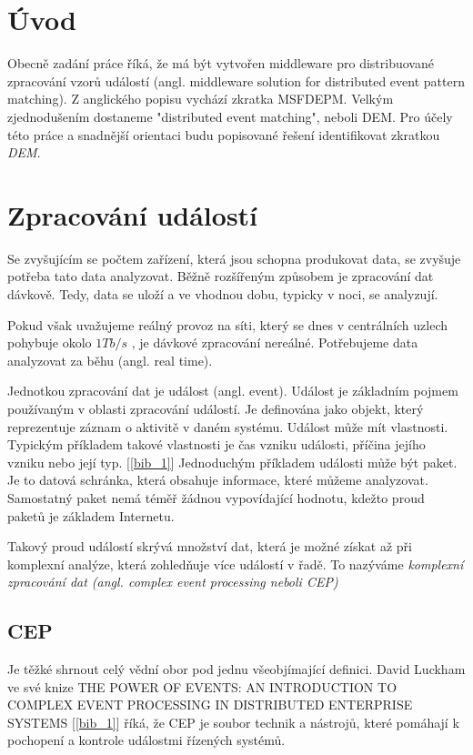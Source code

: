 \documentclass[
  digital, %
  table,   %
  nolof,     %
  nolot,     %
  twoside, %
  nocover,
  monochrome,
  12pt
]{fithesis3}
\begin{document}
\chapter{Úvod}

Obecně zadání práce říká, že má být vytvořen middleware pro distribuované zpracování vzorů událostí (angl. middleware solution for distributed event pattern matching). Z anglického popisu vychází zkratka MSFDEPM. Velkým zjednodušením dostaneme "distributed event matching", neboli DEM. Pro účely této práce a snadnější orientaci budu popisované řešení identifikovat zkratkou \textit{DEM}.

\chapter{Zpracování událostí}
Se zvyšujícím se počtem zařízení, která jsou schopna produkovat data, se zvyšuje potřeba tato data analyzovat. Běžně rozšířeným způsobem je zpracování dat dávkově. Tedy, data se uloží a ve vhodnou dobu, typicky v noci, se analyzují.

Pokud však uvažujeme reálný provoz na síti, který se dnes v centrálních uzlech pohybuje okolo $1 Tb/s$ 
, je dávkové zpracování nereálné. Potřebujeme data analyzovat za běhu (angl. real time).

Jednotkou zpracování dat je událost (angl. event). Událost je základním pojmem používaným v oblasti zpracování událostí. Je definována jako objekt, který reprezentuje záznam o aktivitě v daném systému. Událost může mít vlastnosti. Typickým příkladem takové vlastnosti je čas vzniku události, příčina jejího vzniku nebo její typ. [\ref{bib_1}] Jednoduchým příkladem události může být paket. Je to datová schránka, která obsahuje informace, které můžeme analyzovat. Samostatný paket nemá téměř žádnou vypovídající hodnotu, kdežto proud paketů je základem Internetu.

Takový proud událostí skrývá množství dat, která je možné získat až při komplexní analýze, která zohledňuje více událostí v řadě. To nazýváme \textit{komplexní zpracování dat (angl. complex event processing neboli CEP)}


\section{CEP}

Je těžké shrnout celý vědní obor pod jednu všeobjímající definici. David Luckham ve své knize  THE POWER OF EVENTS: AN INTRODUCTION TO COMPLEX EVENT PROCESSING IN DISTRIBUTED ENTERPRISE SYSTEMS [\ref{bib_1}] říká, že CEP je soubor technik a nástrojů, které pomáhají k pochopení a kontrole událostmi řízených systémů.
\end{document}
